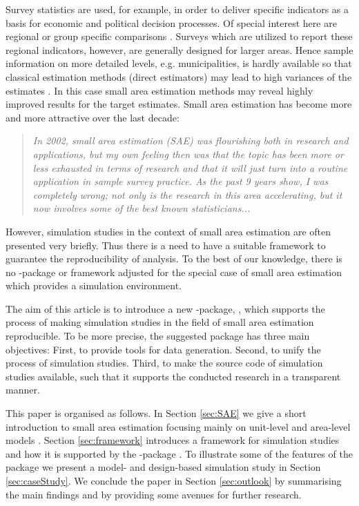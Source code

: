 \documentclass[article]{ajs}
\begin{document}
Survey statistics are used, for example, in order to deliver specific indicators as a basis for economic and political decision processes. Of special interest here are regional or group specific comparisons \citep[cf.][]{Sch13}. Surveys which are utilized to report these regional indicators, however, are generally designed for larger areas. Hence sample information on more detailed levels, e.g. municipalities, is hardly available so that classical estimation methods (direct estimators) may lead to high variances of the estimates \citep[cf.][]{Gho94}. In this case small area estimation methods may reveal highly improved results for the target estimates. Small area estimation has become more and more attractive over the last decade:

\begin{quote}
\textit{In 2002, small area estimation (SAE) was flourishing both in research and applications, but my own feeling then was that the topic has been more or less exhausted in terms of research and that it will just turn into a routine application in sample survey practice. As the past 9 years show, I was completely wrong; not only is the research in this area accelerating, but it now involves some of the best known statisticians...} \cite{pfeffermann13} 
\end{quote} 

However, simulation studies in the context of small area estimation are often presented very briefly. Thus there is a need to have a suitable framework to guarantee the reproducibility of analysis. To the best of our knowledge, there is no -package or framework adjusted for the special case of small area estimation which provides a simulation environment.

The aim of this article is to introduce a new -package, , which supports the process of making simulation studies in the field of small area estimation reproducible. To be more precise, the suggested package has three main objectives: First, to provide tools for data generation. Second, to unify the process of simulation studies. Third, to make the source code of simulation studies available, such that it supports the conducted research in a transparent manner.

This paper is organised as follows. In Section \ref{sec:SAE} we give a short introduction to small area estimation focusing mainly on unit-level \citep{battese88} and area-level models \citep{fay79}. Section \ref{sec:framework} introduces a framework for simulation studies and how it is supported by the  -package . To illustrate some of the features of the package we present a model- and design-based simulation study in Section \ref{sec:caseStudy}. We conclude the paper in Section \ref{sec:outlook} by summarising the main findings and by providing some avenues for further research.
\end{document}
